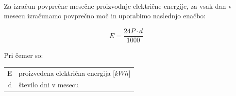 Za izračun povprečne mesečne proizvodnje električne energije, za vsak dan v mesecu izračunamo povprečno moč in uporabimo naslednjo enačbo:

\begin{ceqn}
\begin{align}
E = \dfrac{24P \cdot d}{1000}
\end{align}
\end{ceqn}

Pri čemer so:
\begin{table}[htb!]
\begin{tabular}{r|p{10cm}}
	E & proizvedena električna energija [$kWh$]\\
	d & število dni v mesecu \\
\end{tabular}
\end{table}

